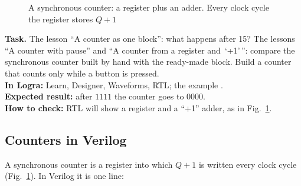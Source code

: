 \begin{figure}[H]
\centering
{}
\caption{A synchronous counter: a register plus an adder. Every clock cycle the register
stores $Q+1$}
\label{fig:sync_counter}
\end{figure}

\begin{diybox}
\textbf{Task.}  The lesson ``A counter as one block'': what happens after 15?
 The lessons ``A counter with pause'' and ``A counter from a register and
\,`+1'\,'': compare the synchronous counter built by hand with the ready-made
block.  Build a counter that counts only while a button is pressed.\\
\textbf{In Logra:} Learn, Designer, Waveforms, RTL; the example
.\\
\textbf{Expected result:} after $1111$ the counter goes to $0000$.\\
\textbf{How to check:} RTL will show a register and a ``+1'' adder, as in
Fig.~\ref{fig:sync_counter}.
\end{diybox}

\subsection{Counters in Verilog}
\label{sec:regs-cnt-v}

A synchronous counter is a register into which $Q+1$ is written every clock
cycle (Fig.~\ref{fig:sync_counter}). In Verilog it is one line:


